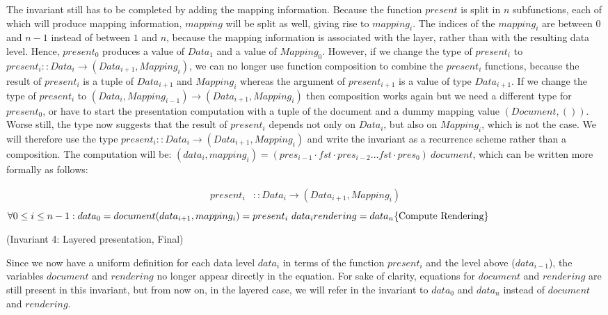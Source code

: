The invariant still has to be completed by adding the mapping information. Because the function $present$ is split in $n$ subfunctions, each of which will produce mapping information, $mapping$ will be split as well, giving rise to $mapping_i$. The indices of the $mapping_i$ are between $0$ and $n-1$ instead of between $1$ and $n$, because the mapping information is associated with the layer, rather than with the resulting data level. Hence, $present_0$ produces a value of $Data_1$ and a value of $Mapping_0$. However, if we change the type of $present_i$ to $present_i :: Data_i \rightarrow (Data_{i+1}, Mapping_{i})$, we can no longer use function composition to combine the $present_i$ functions, because the result of $present_i$ is a tuple of $Data_{i+1}$ and $Mapping_{i}$ whereas the argument of $present_{i+1}$ is a value of type $Data_{i+1}$. If we change the type of $present_i$ to $(Data_i, Mapping_{i-1}) \rightarrow (Data_{i+1}, Mapping_i)$ then composition works again but we need a different type for $present_0$, or have to start the presentation computation with a tuple of the document and a dummy mapping value $(Document, ())$. Worse still, the type now suggests that the result of $present_i$ depends not only on $Data_i$, but also on $Mapping_i$, which is not the case. We will therefore use the type $present_i :: Data_i \rightarrow (Data_{i+1}, Mapping_i)$ and write the invariant as a recurrence scheme rather than a composition. The computation will be: $(data_i, mapping_i) = (pres_{i-1} \cdot fst \cdot pres_{i-2} \ldots fst \cdot pres_{0})~document$, which can be written more formally as follows: \begin{small}\begin{align*} %
present_i & :: Data_i \rightarrow (Data_{i+1}, Mapping_{i}) \\
\end{align*}
\begin{math}
\forall 0 \le i \le n-1: \\
data_0 = document \\
(data_{i+1}, mapping_{i}) = present_i~data_i\\
rendering = data_n \hfill \text{\{Compute Rendering\}}
\end{math}\end{small}

{\centering (Invariant 4: Layered presentation, Final)\\}\vspace{1em} 

Since we now have a uniform definition for each data level $data_i$ in terms of the function $present_i$ and the level above ($data_{i-1}$), the variables $document$ and $rendering$ no longer appear directly in the equation. For sake of clarity, equations for $document$ and $rendering$ are still present in this invariant, but from now on, in the layered case, we will refer in the invariant to $data_0$ and $data_n$ instead of $document$ and $rendering$.
